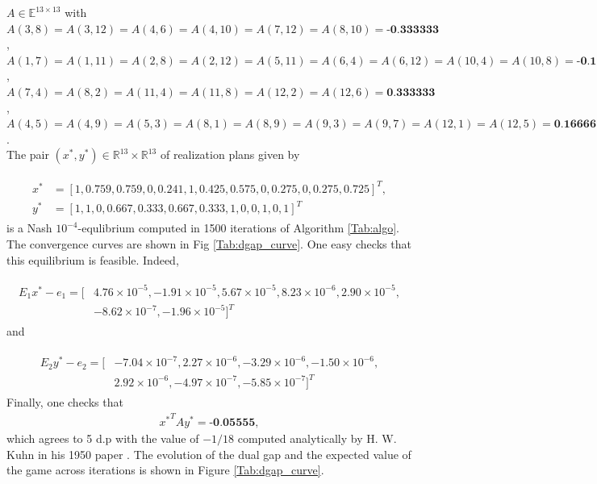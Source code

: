 \documentclass[envcountsame]{llcns2e/llncs}
\begin{document}
 $A \in \mathbb{E}^{13 \times
  13}$ with $A(3,8) = A(3,12) = A(4,6) = A(4,10) = A(7,12) = A(8,10) =
\textbf{-0.333333}$, $A(1,7) = A(1,11) = A(2,8) = A(2,12) = A(5,11) =
A(6,4) = A(6,12) = A(10,4) = A(10,8) = \textbf{-0.166667}$, $A(7,4) =
A(8,2) = A(11,4) = A(11,8) = A(12,2) = A(12,6) = \textbf{0.333333}$,
$A(4,5) = A(4,9) = A(5,3) = A(8,1) = A(8,9) = A(9,3) = A(9,7) =
A(12,1) = A(12,5) = \textbf{0.166667}$.\\

The pair $(x^*, y^*) \in \mathbb{R}^{13} \times \mathbb{R}^{13}$ of
realization plans given by

\begin{eqnarray*}
  \begin{split}
    x^* &= [1, 0.759, 0.759, 0, 0.241, 1, 0.425, 0.575, 0, 0.275, 0,
      0.275, 0.725]^T,\\
    y^* &= [1, 1, 0, 0.667, 0.333, 0.667, 0.333, 1, 0, 0, 1, 0, 1]^T
    \end{split}
\end{eqnarray*}
is a Nash $10^{-4}$-equlibrium computed in 1500 iterations of
Algorithm  \ref{Tab:algo}. The convergence curves are shown
in Fig \ref{Tab:dgap_curve}. One easy checks that this equilibrium is
feasible. Indeed,

\begin{eqnarray*}
  \begin{split}
    E_1x^* - e_1 = [&4.76 \times 10^{-5}, -1.91 \times 10^{-5}, 5.67
      \times 10^{-5}, 8.23 \times 10^{-6}, 2.90 \times 10^{-5}, \\&
      -8.62 \times 10^{-7}, -1.96 \times 10^{-5}]^T
    \end{split}
\end{eqnarray*}
and

\begin{eqnarray*}
  \begin{split}
    E_2y^* - e_2 = [&-7.04 \times 10^{-7}, 2.27 \times 10^{-6}, -3.29
      \times 10^{-6}, -1.50 \times 10^{-6},\\
      &2.92 \times 10^{-6}, -4.97 \times 10^{-7}, -5.85 \times
      10^{-7}]^T
    \end{split}
\end{eqnarray*}
Finally, one checks that
\begin{eqnarray*}
  {x^*}^TAy^* = \textbf{-0.05555},
\end{eqnarray*}
 which agrees to 5 d.p with the value of $-1 / 18$ computed
 analytically by H. W. Kuhn in his 1950 paper \cite{kuhn}. The
 evolution of the dual gap and the expected value of the game across
 iterations is shown in Figure \ref{Tab:dgap_curve}.
\end{document}
